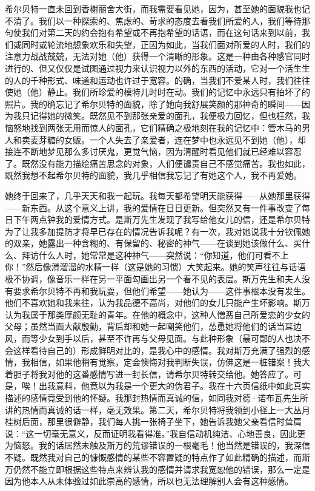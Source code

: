 \par 希尔贝特一直未回到香榭丽舍大街，而我需要看见她，因为，甚至她的面貌我也记不清了。我们以一种探索的、焦虑的、苛求的态度去看我们所爱的人，我们等待那句使我们对第二天的约会抱有希望或不再抱希望的话语，而在这句话来到以前，我们或同时或轮流地想象欢乐和失望，正因为如此，当我们面对所爱的人时，我们的注意力战战兢兢，无法对她（他）获得一个清晰的形象。这是一种由各种感官同时进行的、但又仅仅是试图通过视力来认识视力以外的东西的活动，它对一个活生生的人的千种形式、味道和运动也许过于宽容。的确，当我们不爱某人时，我们往往使她（他）静止。我们所珍爱的模特儿时时在动。我们的记忆中永远只有拍坏了的照片。我的确忘记了希尔贝特的面貌，除了她向我舒展笑颜的那神奇的瞬间——因为我只记得她的微笑。既然见不到那张亲爱的面孔，我便极力回忆，但也枉然，我恼怒地找到两张无用而惊人的面孔，它们精确之极地刻在我的记忆中：管木马的男人和卖麦芽糖的女贩。一个人失去了亲爱者，连在梦中也永远见不到她（他），却接连不断地梦见那么多讨厌鬼，更觉气恼，因为清醒时看见他们就已经难以容忍了。既然没有能力描绘痛苦思念的对象，人们便谴责自己不感觉痛苦。我也如此，既然我想不起希尔贝特的面貌，我几乎相信我忘记了有她这个人，我不再爱她。
\par 她终于回来了，几乎天天和我一起玩。我每天都希望明天能获得——从她那里获得——新东西。从这个意义上讲，我的爱情在日日更新。但突然又有一件事改变了每日下午两点钟我的爱情方式。是斯万先生发现了我写给他女儿的信，还是希尔贝特为了让我多加提防才将早已存在的情况告诉我呢？有一次，我对她说我十分钦佩她的双亲，她露出一种含糊的、有保留的、秘密的神气——在谈到她该做什么、买什么、拜访什么人时，她常常是这种神气——突然说：“你知道，他们可看不上你！”然后像滑溜溜的水精一样（这是她的习惯）大笑起来。她的笑声往往与话语极不协调，像音乐一样在另一平面勾画出另一个看不见的表层。斯万先生和夫人没有要求希尔贝特不再和我玩耍，但他们希望——她认为——这件事根本没有发生。他们不喜欢她和我来往，认为我品德不高尚，对他们的女儿只能产生坏影响。斯万认为我属于那类厚颜无耻的青年。在他的概念中，这种人憎恶自己所爱恋的少女的父母；虽然当面大献殷勤，背后却和她一起嘲笑他们，怂恿她将他们的话当耳边风，而等少女到手以后，甚至不许再与父母见面。与此种形象（最可鄙的人也决不会这样看待自己的）形成鲜明对比的，是我心中的感情。我对斯万充满了强烈的感情，我相信，如果他稍有觉察，定会懊悔对我判断失误，仿佛这是一桩错案！我大着胆子将我对他的这番感情写进一封长信，请希尔贝特转交给他。她答应了。可是，唉！出我意料，他竟以为我是一个更大的伪君子。我在十六页信纸中如此真实描述的感情竟受到他的怀疑。我那封热情而真诚的信，如同我对德·诺布瓦先生所讲的热情而真诚的话一样，毫无效果。第二天，希尔贝特将我领到小径上一大丛月桂树后面，那里很僻静，我们每人挑一张椅子坐下，她告诉我她父亲看信时耸肩说：“这一切毫无意义，反而证明我看得准。”我自信动机纯洁、心地善良，因此更为恼怒。我的话居然未触及斯万的荒谬错误的一根毫毛！他当然是错误的，我深信不疑。既然我对自己的慷慨感情的某些不容置疑的特点作了如此精确的描述，而斯万仍然不能立即根据这些特点来辨认我的感情并请求我宽恕他的错误，那么一定是因为他本人从未体验过如此崇高的感情，所以也无法理解别人会有这种感情。
